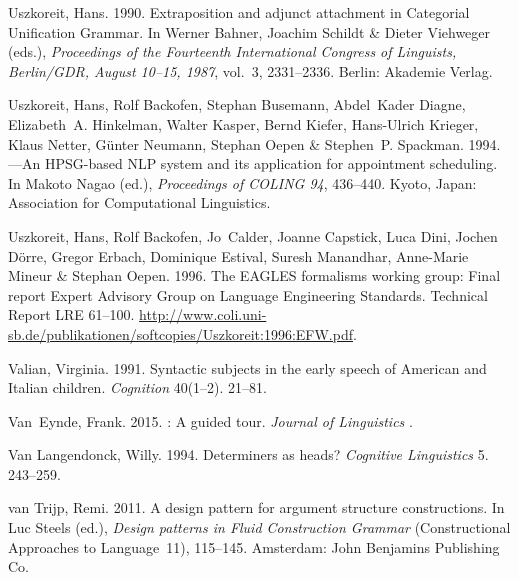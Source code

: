 \begin{thebibliography}{1420}
Uszkoreit, Hans. 1990.
\newblock Extraposition and adjunct attachment in {Categorial Unification
  Grammar}.
\newblock In Werner Bahner, Joachim Schildt \& Dieter Viehweger (eds.),
  \emph{Proceedings of the {Fourteenth International Congress of Linguists,
  {Berlin/GDR, August} 10--15, 1987}}, vol.~3, 2331--2336. Berlin: Akademie
  Verlag.

Uszkoreit, Hans, Rolf Backofen, Stephan Busemann, Abdel~Kader Diagne,
  Elizabeth~A. Hinkelman, Walter Kasper, Bernd Kiefer, Hans-Ulrich Krieger,
  Klaus Netter, G{\"u}nter Neumann, Stephan Oepen \& Stephen~P. Spackman. 1994.
---{An} {HPSG}-based {NLP} system and its application for
  appointment scheduling.
\newblock In Makoto Nagao (ed.), \emph{Proceedings of {COLING} 94}, 436--440.
  Kyoto, Japan: Association for Computational Linguistics.

Uszkoreit, Hans, Rolf Backofen, Jo~Calder, Joanne Capstick, Luca Dini, Jochen
  D{\"o}rre, Gregor Erbach, Dominique Estival, Suresh Manandhar, Anne-Marie
  Mineur \& Stephan Oepen. 1996.
\newblock The {EAGLES} formalisms working group: {Final} report {Expert
  Advisory Group on Language Engineering Standards}.
\newblock Technical Report LRE 61--100.
\newblock
  \urlprefix\url{http://www.coli.uni-sb.de/publikationen/softcopies/Uszkoreit:1996:EFW.pdf}.

Valian, Virginia. 1991.
\newblock Syntactic subjects in the early speech of {American} and {Italian}
  children.
\newblock \emph{Cognition} 40(1--2). 21--81.

Van~Eynde, Frank. 2015.
: {A} guided tour.
\newblock \emph{Journal of Linguistics} .

{Van Langendonck}, Willy. 1994.
\newblock Determiners as heads?
\newblock \emph{Cognitive Linguistics} 5. 243--259.

{van Trijp}, Remi. 2011.
\newblock A design pattern for argument structure constructions.
\newblock In Luc Steels (ed.), \emph{Design patterns in {Fluid Construction
  Grammar}} (Constructional Approaches to Language~11), 115--145. Amsterdam:
  John Benjamins Publishing Co.


\end{thebibliography}
